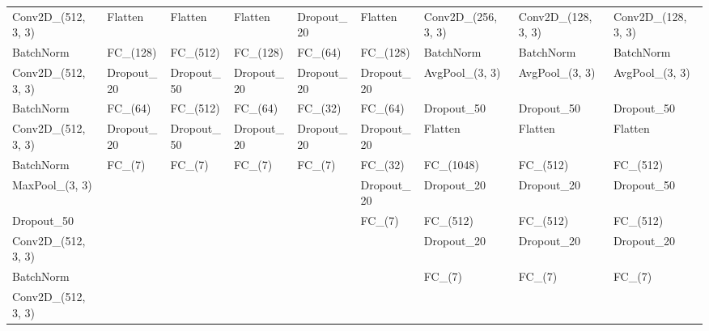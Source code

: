 \begin{table}
{\begin{tabular}{@{}lllllllll@{}}
Conv2D\_(512, 3, 3)   & Flatten               & Flatten               & Flatten               & Dropout\_20           & Flatten               & Conv2D\_(256, 3, 3)   & Conv2D\_(128, 3, 3)   & Conv2D\_(128, 3, 3)   \\
BatchNorm             & FC\_(128)             & FC\_(512)             & FC\_(128)             & FC\_(64)              & FC\_(128)             & BatchNorm             & BatchNorm             & BatchNorm             \\
Conv2D\_(512, 3, 3)   & Dropout\_20           & Dropout\_50           & Dropout\_20           & Dropout\_20           & Dropout\_20           & AvgPool\_(3, 3)       & AvgPool\_(3, 3)       & AvgPool\_(3, 3)       \\
BatchNorm             & FC\_(64)              & FC\_(512)             & FC\_(64)              & FC\_(32)              & FC\_(64)              & Dropout\_50           & Dropout\_50           & Dropout\_50           \\
Conv2D\_(512, 3, 3)   & Dropout\_20           & Dropout\_50           & Dropout\_20           & Dropout\_20           & Dropout\_20           & Flatten               & Flatten               & Flatten               \\
BatchNorm             & FC\_(7)               & FC\_(7)               & FC\_(7)               & FC\_(7)               & FC\_(32)              & FC\_(1048)            & FC\_(512)             & FC\_(512)             \\
MaxPool\_(3, 3)       &                       &                       &                       &                       & Dropout\_20           & Dropout\_20           & Dropout\_20           & Dropout\_50           \\
Dropout\_50           &                       &                       &                       &                       & FC\_(7)               & FC\_(512)             & FC\_(512)             & FC\_(512)             \\
Conv2D\_(512, 3, 3)   &                       &                       &                       &                       &                       & Dropout\_20           & Dropout\_20           & Dropout\_20           \\
BatchNorm             &                       &                       &                       &                       &                       & FC\_(7)               & FC\_(7)               & FC\_(7)               \\
Conv2D\_(512, 3, 3)   &                       &                       &                       &                       &                       &                       &                       &                       \\

\end{tabular}}
\end{table}
